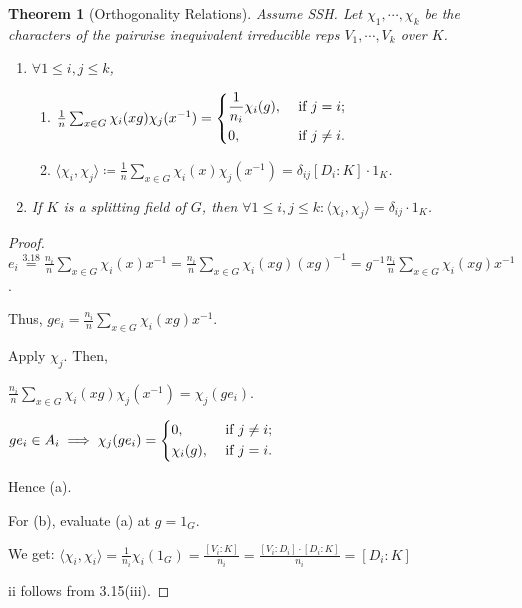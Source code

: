\documentclass{article}
\theoremstyle{definition}
\theoremstyle{plain}
\newtheorem{theorem}{Theorem}[section]
\theoremstyle{remark}
\begin{document}
    \begin{theorem}
        [Orthogonality Relations]

        Assume SSH. Let \(\chi_1 , \cdots , \chi_k\) be the characters of the pairwise inequivalent irreducible reps \(V_1 , \cdots , V_k\) over \(K\).

        \begin{enumerate}[label=\roman*)]
            \item \(\forall 1 \leq i, j \leq k\),
            
            \begin{enumerate}[label=\alph*)]
                \item \(\frac{1}{n} \sum_{x\in G} \chi_i(xg) \chi_j(x ^{-1}) = \begin{dcases}
                    \frac{1}{n_i}\chi_i(g), &\text{ if } j=i ;\\
                    0, &\text{ if } j\neq i.
                \end{dcases}\)  
                \item \(\langle \chi_i , \chi_j \rangle \coloneqq \frac{1}{n} \sum_{x\in G} \chi_i(x) \chi_j(x ^{-1}) = \delta_{ij} [D_i : K] \cdot 1_K\).
            \end{enumerate} 

            \item If \(K\) is a splitting field of \(G\), then \(\forall 1 \leq i , j \leq k : \langle \chi_i, \chi_j \rangle = \delta_{ij} \cdot 1_K\).
        \end{enumerate} 
    \end{theorem}

    \begin{proof}
        \(e_i \overset{3.18}{=} \frac{n_i}{n} \sum_{x\in G} \chi_i(x) x ^{-1} = \frac{n_i}{n} \sum_{x\in G} \chi_i(xg)(xg)^{-1} = g ^{-1} \frac{n_i}{n} \sum_{x\in G} \chi_i(xg) x ^{-1}\).

        Thus, \(g e_i = \frac{n_i}{n} \sum_{x\in G} \chi_i(xg) x ^{-1}\).

        Apply \(\chi_j\). Then,

        \(\frac{n_i}{n} \sum_{x\in G} \chi_i(xg) \chi_j(x ^{-1}) =\chi _j(ge_i)\).
        
        \(ge_i \in A_i \implies \chi_j(ge_i) = \begin{dcases}
            0, &\text{ if } j\neq i ;\\
            \chi_i(g), &\text{ if } j=i.
        \end{dcases}\)

        Hence (a).

        For (b), evaluate (a) at \(g=1_G\).

        We get: \(\langle \chi_i , \chi_i \rangle = \frac{1}{n_i} \chi_i(1_G) = \frac{[V_i : K]}{n_i} = \frac{[V_i : D_i] \cdot [D_i : K]}{n_i} = [D_i : K]\) 

        ii follows from 3.15(iii).
    \end{proof}
\end{document}
